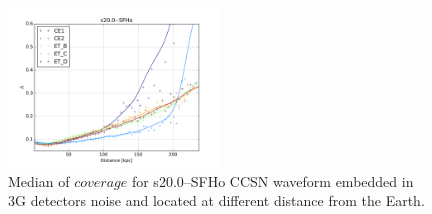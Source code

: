 \begin{figure}
  \centering
  \includegraphics[width=0.5\textwidth]{plots/s20--SFHo_all3G}
  \caption{Median of $coverage$ for s20.0--SFHo CCSN waveform embedded in 3G detectors noise and located at different distance from the Earth. } \label{fig:s20--SFHo_all3G}
\end{figure}
